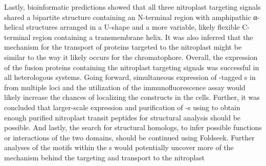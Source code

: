 Lastly, bioinformatic predictions showed that all three nitroplast targeting signals shared a bipartite structure containing an N-terminal region with amphipathic α-helical structures arranged in a U-shape and a more variable, likely flexible C-terminal region containing a transmembrane helix. It was also inferred that the mechanism for the transport of proteins targeted to the nitroplast might be similar to the way it likely occurs for the chromatophore.  
Overall, the expression of the fusion proteins containing the nitroplast targeting signals was successful in all heterologous systems. 
Going forward, simultaneous expression of -tagged s in  from multiple loci and the utilization of the immunofluorescence assay would likely increase the chances of localizing the constructs in the cells.
Further, it was concluded that larger-scale expression and purification of -s using  to obtain enough purified nitroplast transit peptides for structural analysis should be possible. 
And lastly, the search for structural homologs, to infer possible functions or interactions of the two domains, should be continued using Foldseek. Further analyses of the motifs within the  s would potentially uncover more of the mechanism behind the targeting and transport to the nitroplast